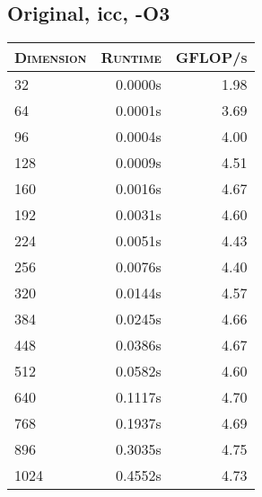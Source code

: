 \begin{table}[!htb]
\begin{minipage}{.5\linewidth}
\subsection{Original, icc, -O3}
\begin{tabular}{|l|r|r|}
	\hline
	\textsc{Dimension} & \textsc{Runtime} & \textsc{GFLOP/s} \\
	\hline
	\hline
	32  &  0.0000s  & 1.98 \\ 
	\hline 
	64  &  0.0001s  & 3.69 \\ 
	\hline 
	96  &  0.0004s  & 4.00 \\ 
	\hline 
	128  &  0.0009s  & 4.51 \\ 
	\hline 
	160  &  0.0016s  & 4.67 \\ 
	\hline 
	192  &  0.0031s  & 4.60 \\ 
	\hline 
	224  &  0.0051s  & 4.43 \\ 
	\hline 
	256  &  0.0076s  & 4.40 \\ 
	\hline 
	320  &  0.0144s  & 4.57 \\ 
	\hline 
	384  &  0.0245s  & 4.66 \\ 
	\hline 
	448  &  0.0386s  & 4.67 \\ 
	\hline 
	512  &  0.0582s  & 4.60 \\ 
	\hline 
	640  &  0.1117s  & 4.70 \\ 
	\hline 
	768  &  0.1937s  & 4.69 \\ 
	\hline 
	896  &  0.3035s  & 4.75 \\ 
	\hline 
	1024  &  0.4552s  & 4.73 \\ 
	\hline 
\end{tabular}
\end{minipage}%
\end{table}




